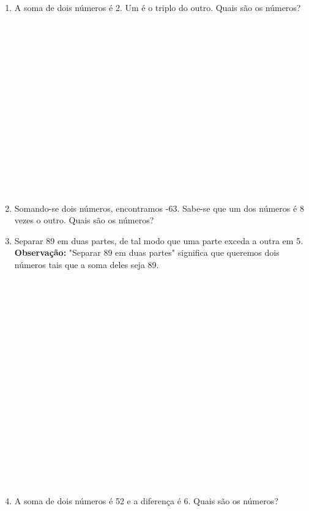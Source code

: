 \documentclass[a4paper,14pt]{article}
\begin{document}
\begin{multicols}{2}
\begin{enumerate}
			\item A soma de dois números é 2. Um é o triplo do outro. Quais são os números? \\\\\\\\\\\\\\\\\\\\\\\\\\\\\\\\
			\item Somando-se dois números, encontramos -63. Sabe-se que um dos números é 8 vezes o outro. Quais são os números? \newpage
			\item Separar 89 em duas partes, de tal modo que uma parte exceda a outra em 5. \\
			\textbf{Observação: } "Separar 89 em duas partes" significa que queremos dois números tais que a soma deles seja 89. \\\\\\\\\\\\\\\\\\\\\\\\\\\\\\\\\\\\\\
			\item A soma de dois números é 52 e a diferença é 6. Quais são os números? \\\\\\\\\\\\\\\\\\\\\\\\

\end{enumerate}
\end{multicols}
\end{document}
